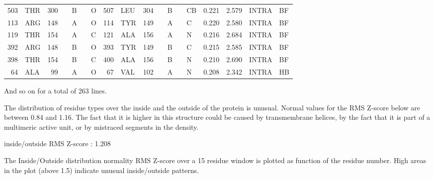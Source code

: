 \begin{error}
\begin{center}
\begin{supertabular}{rl@{ (}r@{}c@{) }l@{}rl@{ -- }rl@{ (}r@{}c@{) }l@{}rlrrll}
 503&THR & 300& &B&  & O    & 507&LEU & 304& &B&  & CB   &  0.221&  2.579&INTRA&BF\\
 113&ARG & 148& &A&  & O    & 114&TYR & 149& &A&  & C    &  0.220&  2.580&INTRA&BF\\
 119&THR & 154& &A&  & C    & 121&ALA & 156& &A&  & N    &  0.216&  2.684&INTRA&BF\\
 392&ARG & 148& &B&  & O    & 393&TYR & 149& &B&  & C    &  0.215&  2.585&INTRA&BF\\
 398&THR & 154& &B&  & C    & 400&ALA & 156& &B&  & N    &  0.210&  2.690&INTRA&BF\\
  64&ALA &  99& &A&  & O    &  67&VAL & 102& &A&  & N    &  0.208&  2.342&INTRA&HB\\
\end{supertabular}\end{center}
And so on for a total of   263 lines.
\end{error}

\begin{warning}
The distribution of residue types over the inside and the outside of the
protein is unusual. Normal values for the RMS Z-score below are between
0.84 and 1.16. The fact that it is higher in this structure could be
caused by transmembrane helices, by the fact that it is part of a
multimeric active unit, or by mistraced segments in the density.

\parbox{1\textwidth}{
inside/outside RMS Z-score : 1.208
}%

\end{warning}

\begin{note}
The Inside/Outside distribution normality RMS Z-score over a 15
residue window is plotted as function of the residue number. High
areas in the plot (above 1.5) indicate unusual inside/outside
patterns.

\parbox{1\textwidth}{
}%


\parbox{1\textwidth}{
}%

\end{note}

\begin{note}


\parbox{1\textwidth}{
}%


\parbox{1\textwidth}{
}%

\end{note}

